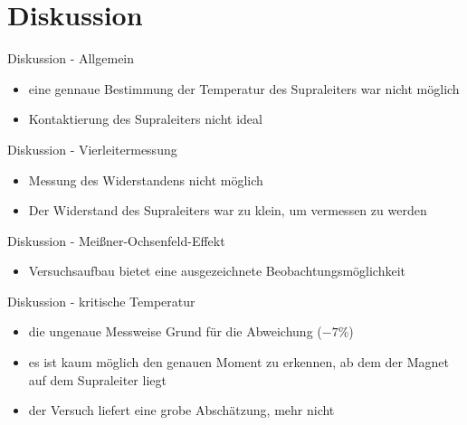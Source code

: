 \section{Diskussion}
\begin{frame}{Diskussion - Allgemein}
  \begin{itemize}
    \item{eine gennaue Bestimmung der Temperatur des Supraleiters war nicht möglich}
    \item{Kontaktierung des Supraleiters nicht ideal}
  \end{itemize}
\end{frame}

\begin{frame}{Diskussion - Vierleitermessung}
  \begin{itemize}
    \item{Messung des Widerstandens nicht möglich}
    \item {Der Widerstand des Supraleiters war zu klein, um vermessen zu werden}
\end{itemize}
\end{frame}

\begin{frame}{Diskussion - Meißner-Ochsenfeld-Effekt}
  \begin{itemize}
    \item{ Versuchsaufbau bietet eine ausgezeichnete Beobachtungsmöglichkeit}
\end{itemize}
\end{frame}

\begin{frame} {Diskussion - kritische Temperatur}
  \begin{itemize}
    \item{die ungenaue Messweise Grund für die Abweichung ($-7\%$)}
    \item{es ist kaum möglich den genauen Moment zu erkennen, ab dem der Magnet auf dem Supraleiter liegt}
    \item{der Versuch liefert eine grobe Abschätzung, mehr nicht}
  \end{itemize}
\end{frame}
